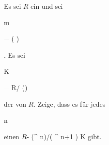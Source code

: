 {} {}



{}

{


Es sei $R$ ein
und sei


\mavergleichskette

{\vergleichskette

{ {\mathfrak m}
}

{ = }{ ( \pi)
}

{  }{
}

{    }{
}

{   }{
}

}
{}{}{.}
Es sei


\mavergleichskette

{\vergleichskette

{K
}

{ = }{ R/ (\pi)
}

{  }{
}

{    }{
}

{   }{
}

}
{}{}{}
der
von $R$. Zeige, dass es für jedes


\mavergleichskette

{\vergleichskette

{ n
}

{ \in }{ \N
}

{  }{
}

{    }{
}

{   }{
}

}
{}{}{}
einen
$R$-
\maabbdisp {} { (\pi^ n)/( \pi^ {n+1} )} { K
} {}
gibt.


}

{} {}



{}

